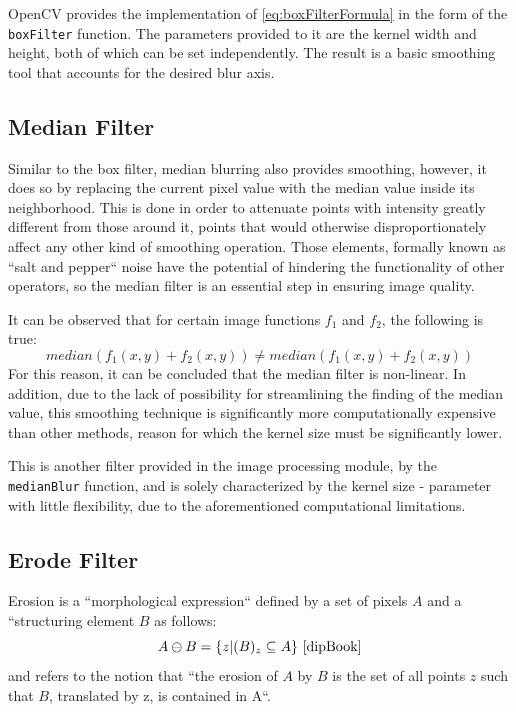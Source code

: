 OpenCV provides the implementation of \cref{eq:boxFilterFormula} in the form of the \verb|boxFilter| function.
The parameters provided to it are the kernel width and height, both of which can be set independently. The
result is a basic smoothing tool that accounts for the desired blur axis.

\subsection{Median Filter}

Similar to the box filter, median blurring also provides smoothing, however, it does so by replacing the
current pixel value with the median value inside its neighborhood. This is done in order to attenuate points
with intensity greatly different from those around it, points that would otherwise disproportionately affect
any other kind of smoothing operation. Those elements, formally known as ``salt and pepper`` noise have the
potential of hindering the functionality of other operators, so the median filter is an essential step in
ensuring image quality. \cite{fipBerkley}

It can be observed that for certain image functions \(f_1\) and \(f_2\), the following is true:
\[median(f_1(x, y) + f_2(x, y)) \neq median(f_1(x, y) + f_2(x, y))\]
For this reason, it can be concluded that the median filter is non-linear. In addition, due to the lack of
possibility for streamlining the finding of the median value, this smoothing technique is significantly more
computationally expensive than other methods, reason for which the kernel size must be significantly lower.

This is another filter provided in the image processing module, by the \verb|medianBlur| function, and is
solely characterized by the kernel size - parameter with little flexibility, due to the aforementioned
computational limitations.

\subsection{Erode Filter}

Erosion is a ``morphological expression`` defined by a set of pixels \(A\) and a ``structuring element \(B\)
as follows: \[A \ominus B = \{z | (B)_z \subseteq A\}\text{ \cite{dipBook}}\] and refers to the notion that
``the erosion of \(A\) by \(B\) is the set of all points \(z\) such that \(B\), translated by z, is contained
in A``. \cite{dipBook}

